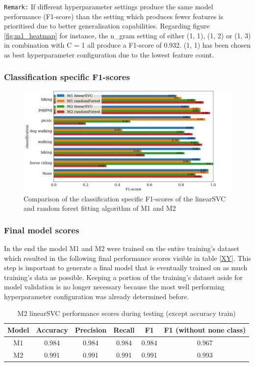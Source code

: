 \texttt{Remark:} If different hyperparameter settings produce the same model performance (F1-score) than the setting which produces fewer features is prioritised due to better generalisation capabilities. Regarding figure \ref{fig:m1_heatmap} for instance, the n\_gram setting of either (1, 1), (1, 2) or (1, 3) in combination with C = 1 all produce a F1-score of 0.932. (1, 1) has been chosen as best hyperparameter configuration due to the lowest feature count.

\subsubsection{Classification specific F1-scores}

\begin{figure}[ht]
   \centering
   \includegraphics[width=\textwidth]{img/m1_m2_class_f1_scores_bigger_font.pdf}
   \caption{Comparison of the classification specific F1-scores of the linearSVC and random forest fitting algorithm of M1 and M2}
   \label{fig:m1_m2_class_f1_scores}
\end{figure}

\subsubsection{Final model scores}
In the end the model M1 and M2 were trained on the entire training's dataset which resulted in the following final performance scores visible in table \ref{XY}. This step is important to generate a final model that is eventually trained on as much training's data as possible. Keeping a portion of the training's dataset aside for model validation is no longer necessary because the most well performing hyperparameter configuration was already determined before.

\begin{table}[h]
\begin{center}
\caption{M2 linearSVC performance scores during testing (except accuracy train)}\vspace{1ex}
\label{tab:m2_linearSVC_bestscores}
\begin{tabular}{cccccc}\hline
Model & Accuracy & Precision & Recall & F1 & F1 (without none class)\\ \hline
M1 & 0.984 & 0.984 & 0.984 & 0.984 & 0.967 \\
M2 & 0.991 & 0.991 & 0.991 & 0.991 & 0.993 \\ \hline
\end{tabular}
\end{center}
\end{table}

